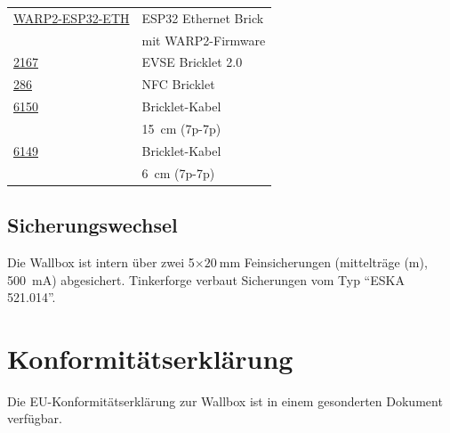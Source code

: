 \documentclass[a4paper,10pt]{article}
\begin{document}
\begin{multicols*}{2}
\begin{tabular}{ll}
		\cmidrule(lr{0.5em}){1-2}
		\href{https://www.tinkerforge.com/de/shop/warp/warp2-spare-parts/warp2-esp32-eth.html}{WARP2-ESP32-ETH}	                    & ESP32 Ethernet Brick                 \\
		                                                                                                                            & mit WARP2-Firmware                   \\
		\cmidrule(lr{0.5em}){1-2}
		\href{https://www.tinkerforge.com/de/shop/warp/warp2-spare-parts/evse-v2-bricklet.html}{2167}                               & EVSE Bricklet 2.0                    \\
		\cmidrule(lr{0.5em}){1-2}
		\href{https://www.tinkerforge.com/de/shop/warp/warp2-spare-parts/nfc-bricklet.html}{286}                                    & NFC Bricklet                         \\
		\cmidrule(lr{0.5em}){1-2}
		\href{https://www.tinkerforge.com/de/shop/accessories/cable/bricklet-cable-15cm-7p-7p.html}{6150}                           & Bricklet-Kabel                       \\
		                                                                                                                            & \SI{15}{\centi\meter} (7p-7p)        \\
		\cmidrule(lr{0.5em}){1-2}
		\href{https://www.tinkerforge.com/de/shop/accessories/cable/bricklet-cable-6cm-7p-7p.html}{6149}                            & Bricklet-Kabel                       \\
		                                                                                                                            & \SI{6}{\centi\meter} (7p-7p)         \\
		\bottomrule
	\end{tabular}

	\subsection{Sicherungswechsel}
	Die Wallbox ist intern über zwei 5$\times\SI{20}{\milli\meter}$ Feinsicherungen (mittelträge (m), \SI{500}{\milli\ampere}) abgesichert.
	Tinkerforge verbaut Sicherungen vom Typ \enquote{ESKA 521.014}.

	\section{Konformitätserklärung}
	Die EU-Konformitätserklärung zur Wallbox ist in einem gesonderten Dokument verfügbar.


\end{multicols*}
\end{document}
